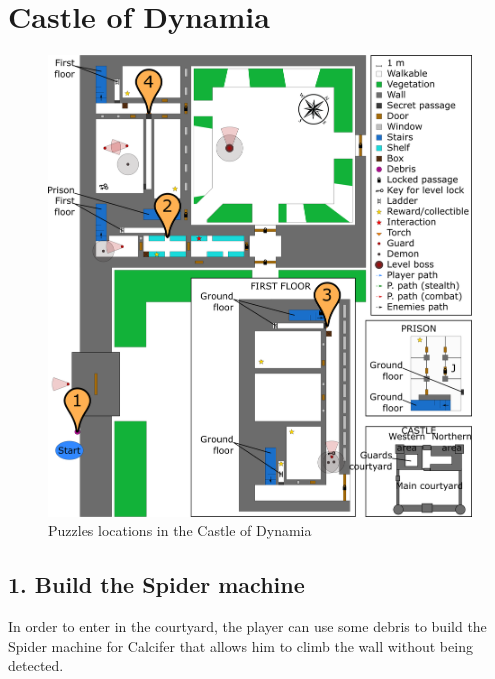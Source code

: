 \section{Castle of Dynamia}

\begin{figure}[H]
  \centering
  \includegraphics[width=\textwidth]{Images/Maps/castleOfDynamiaPuzzles}
  \caption{Puzzles locations in the Castle of Dynamia}
\end{figure}

\subsection{1. Build the Spider machine}


In order to enter in the courtyard, the player can use some debris to build the Spider machine for Calcifer that allows him to climb the wall without being detected.

